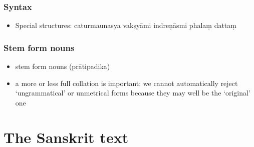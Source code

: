 \documentclass[11pt]{book}
\begin{document}
\subsubsection{Syntax}

\begin{itemize}

\item
  Special structures: caturmaunasya vakṣyāmi indreṇāsmi phalaṃ dattaṃ
\end{itemize}


\subsubsection{Stem form nouns}

\begin{itemize}
\item
  stem form nouns (prātipadika)
\item
  a more or less full collation is important: we cannot automatically
  reject `ungrammatical' or unmetrical forms because they may well be
  the `original' one
\end{itemize}




\vfill
\pagebreak
















\vfill
\pagebreak




\section{The Sanskrit text}








\end{document}
